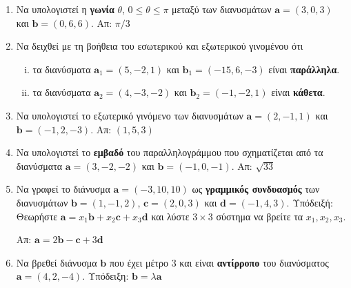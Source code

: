 \documentclass[a4paper,table]{report}
\renewcommand{\vec}{\mathbf}
\begin{document}
\begin{center}
  \minibox{\large \bfseries \textcolor{Col1}{Ασκήσεις στα Διανύσματα}}
\end{center}

\vspace{\baselineskip}

\begin{enumerate}[itemsep=0.7\baselineskip]

  \item Να υπολογιστεί η \textbf{γωνία} $ \theta $, $ 0\leq \theta \leq \pi $ μεταξύ των 
    διανυσμάτων $ \vec{a} = (3,0,3) $ και $ \vec{b} = (0,6,6) $.
    \hfill Απ: $ \pi/{3} $

  \item Να δειχθεί με τη βοήθεια του εσωτερικού και εξωτερικού γινομένου ότι
    \begin{enumerate}[i)]
      \item τα διανύσματα $ \vec{a}_1 = (5,-2,1) $ και $ \vec{b}_1 = (-15,6,-3) $ είναι 
        \textbf{παράλληλα}.
      \item τα διανύσματα $ \vec{a}_2 = (4,-3,-2) $ και $ \vec{b}_2 = (-1,-2,1) $ είναι 
        \textbf{κάθετα}.
    \end{enumerate}

  \item Να υπολογιστεί το εξωτερικό γινόμενο των διανυσμάτων 
    $ \vec{a} = (2,-1,1) $ και $ \vec{b} = (-1,2,-3) $.
    \hfill Απ: $ (1,5,3) $

  \item Να υπολογιστεί το \textbf{εμβαδό} του παραλληλογράμμου που σχηματίζεται από τα 
    διανύσματα $ \vec{a} = (3,-2,-2) $ και $ \vec{b} = (-1,0,-1) $.
    \hfill Απ: $ \sqrt{33} $ 

  \item Να γραφεί το διάνυσμα $ \vec{a}=(-3,10,10) $ ως \textbf{γραμμικός συνδυασμός} 
    των διανυσμάτων $\vec{b}=(1,-1,2)$, $ \vec{c}=(2,0,3) $ και $ \vec{d}=(-1,4,3) $.  
    \hfill 
    \textcolor{Col1}{Υπόδειξή:} Θεωρήστε 
    $ \mathbf{a} = x_{1} \mathbf{b} + x_{2} \mathbf{c} + x_{3} \mathbf{d}$ και λύστε 
    $ 3\times 3 $ σύστημα να βρείτε τα $ x_{1}, x_{2}, x_{3} $. 

    \hfill Απ: $ \vec{a}=2\vec{b}-\vec{c}+3\vec{d} $

  \item Να βρεθεί διάνυσμα $ \vec{b} $ που έχει μέτρο $3$ και είναι \textbf{αντίρροπο} 
    του διανύσματος $ \vec{a}=(4,2,-4)$.
    \hfill Υπόδειξη: $ \vec{b} = \lambda \vec{a} $		


\end{enumerate}
\end{document}
